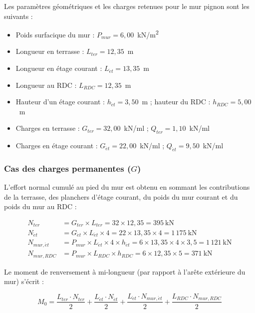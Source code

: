 Les paramètres géométriques et les charges retenues pour le mur pignon sont les suivants :

\begin{itemize}
  \item Poids surfacique du mur : $P_{mur} = 6{,}00$~kN/m\textsuperscript{2}
  \item Longueur en terrasse : $L_{ter} = 12{,}35$~m
  \item Longueur en étage courant : $L_{\acute{e}t} = 13{,}35$~m
  \item Longueur au RDC : $L_{RDC} = 12{,}35$~m
  \item Hauteur d'un étage courant : $h_{\acute{e}t} = 3{,}50$~m ; hauteur du RDC : $h_{RDC} = 5{,}00$~m
  \item Charges en terrasse : $G_{ter} = 32{,}00$~kN/ml ; $Q_{ter} = 1{,}10$~kN/ml
  \item Charges en étage courant : $G_{\acute{e}t} = 22{,}00$~kN/ml ; $Q_{\acute{e}t} = 9{,}50$~kN/ml
\end{itemize}

\subsubsection{Cas des charges permanentes \texorpdfstring{($G$)}{(G)}}

L'effort normal cumulé au pied du mur est obtenu en sommant les contributions de la terrasse, des planchers d'étage courant, du poids du mur courant et du poids du mur au RDC :

\begin{align*}
N_{ter}        &= G_{ter} \times L_{ter} = 32 \times 12{,}35 = 395~\text{kN}\\
N_{\acute{e}t} &= G_{\acute{e}t} \times L_{\acute{e}t} \times 4 = 22 \times 13{,}35 \times 4 = 1\,175~\text{kN}\\
N_{mur,\acute{e}t}  &= P_{mur} \times L_{\acute{e}t} \times 4 \times h_{\acute{e}t} = 6 \times 13{,}35 \times 4 \times 3{,}5 = 1\,121~\text{kN}\\
N_{mur,RDC}    &= P_{mur} \times L_{RDC} \times h_{RDC} = 6 \times 12{,}35 \times 5 = 371~\text{kN}
\end{align*}


Le moment de renversement à mi-longueur (par rapport à l'arête extérieure du mur) s'écrit :

\[
M_0 = \frac{L_{ter} \cdot N_{ter}}{2} + \frac{L_{\acute{e}t} \cdot N_{\acute{e}t}}{2} + \frac{L_{\acute{e}t} \cdot N_{mur,\acute{e}t}}{2} + \frac{L_{RDC} \cdot N_{mur,RDC}}{2}
\]

